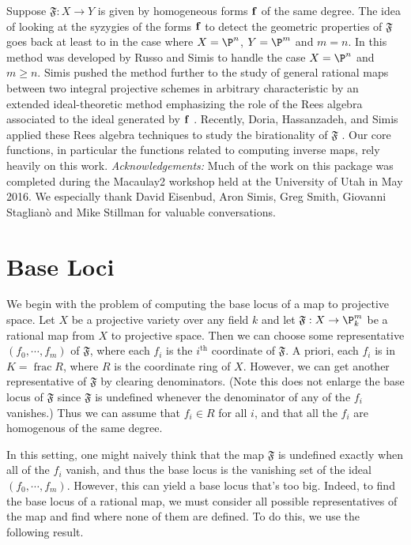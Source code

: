 \documentclass[11pt]{amsart}
\numberwithin{equation}{theorem}
\def\ff{{\bf f}}
\renewcommand{\:}{\colon}
\DeclareMathOperator{\ffield}{frac} %
\theoremstyle{theorem}
\begin{document}
Suppose $\mathfrak{F} : X \to Y$ is given by homogeneous forms $\ff$ of the same degree.
The idea of looking at the syzygies of the forms $\ff$ to detect the geometric properties of  $\mathfrak{F}$ goes
back at least to \cite{SempleTyrrell,HulekKatzSchreyer} in the case
where $X=\P^n$, $Y = \P^m$ and $m=n$. In \cite{RussoSimisCompositio}  this method was developed by Russo and Simis
to handle the case $X=\P^n$ and $m\geq n$. Simis pushed the method further to the study
of general rational maps between two integral projective schemes in
arbitrary characteristic by an extended ideal-theoretic method
emphasizing the role of the Rees algebra associated to the ideal
generated by $\ff$ \cite{SimisCremona}.  Recently,  Doria, Hassanzadeh, and Simis applied these
 Rees algebra techniques to study the birationality of  $\mathfrak{F}$ \cite{DoriaHassanzadehSimisBirationality}.  Our core functions, in particular the functions related to computing inverse maps, rely heavily on this work.
\vskip 12pt
\noindent
\emph{Acknowledgements:}  Much of the work  on this package was completed during the Macaulay2 workshop held at the University of Utah in May 2016.  We especially thank David Eisenbud, Aron Simis, Greg Smith, Giovanni Staglian\`o and Mike Stillman for valuable conversations.



\section{Base Loci}

We begin with the problem of computing the base locus of a map to projective space. Let $X$ be a projective variety over any field $k$ and let $\mathfrak{F}: X \to \P_k^m$ be a rational map from $X$ to projective space. Then we can choose some representative $(f_0, \cdots, f_m)$ of $\mathfrak{F}$, where each $f_i$ is the $i^{\textrm{th}}$ coordinate of $\mathfrak{F}$. A priori, each $f_i$ is in $K = \ffield R$, where $R$ is the coordinate ring of $X$. However, we can get another representative of $\mathfrak{F}$ by clearing denominators. (Note this does not enlarge the base locus of $\mathfrak{F}$ since $\mathfrak{F}$ is undefined whenever the denominator of any of the $f_i$ vanishes.) Thus we can assume that $f_i\in R$ for all $i$, and that all the $f_i$ are homogenous of the same degree.

In this setting, one might naively think that the map $\mathfrak{F}$ is undefined exactly when all of the $f_i$ vanish, and thus the base locus is the vanishing set of the ideal $(f_0, \cdots, f_m)$. However, this can yield a base locus that's too big.  Indeed, to find the base locus of a rational map, we must consider all possible representatives of the map and find where none of them are defined. To do this, we use the following result.
\end{document}
